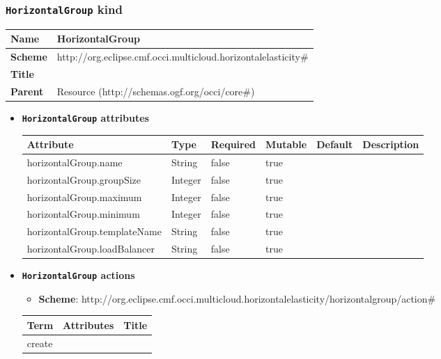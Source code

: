 \subsubsection{\texttt{HorizontalGroup} kind}
\begin{center}
\begin{tabular}{|l|l|}
  \hline
  \textbf{Name} & HorizontalGroup \\
  \hline  
  \textbf{Scheme} & http://org.eclipse.cmf.occi.multicloud.horizontalelasticity\# \\
  \hline
  \textbf{Title} &  \\
  \hline
  \textbf{Parent} & Resource (http://schemas.ogf.org/occi/core\#) \\
  \hline
\end{tabular}
\end{center}
\begin{itemize}
\item \textbf{\texttt{HorizontalGroup} attributes}

\begin{tabularx}{\textwidth}{|l|l|p{1.4cm}|p{1.3cm}|l|X|}
  \hline
  \textbf{Attribute} & \textbf{Type} & \textbf{Required} & \textbf{Mutable} & \textbf{Default} & \textbf{Description} \\
  \hline  
  horizontalGroup.name & String & false & true &  &  \\
  \hline
  horizontalGroup.groupSize & Integer & false & true &  &  \\
  \hline
  horizontalGroup.maximum & Integer & false & true &  &  \\
  \hline
  horizontalGroup.minimum & Integer & false & true &  &  \\
  \hline
  horizontalGroup.templateName & String & false & true &  &  \\
  \hline
  horizontalGroup.loadBalancer & String & false & true &  &  \\
  \hline
\end{tabularx}
\end{itemize}

\begin{itemize}
\item \textbf{\texttt{HorizontalGroup} actions}

\begin{itemize}
	\item \textbf{Scheme}: http://org.eclipse.cmf.occi.multicloud.horizontalelasticity/horizontalgroup/action\#
\end{itemize}

\begin{center}
\begin{tabular}{|l|l|l|}
  \hline
  \textbf{Term}  & \textbf{Attributes} & \textbf{Title} \\
  \hline  
  create & &  \\
  \hline
\end{tabular}
\end{center}
\end{itemize}


